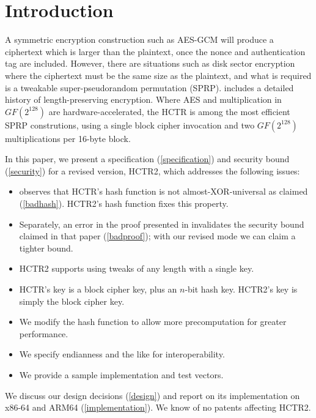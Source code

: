 \documentclass[hctr2.tex]{subfiles}
\begin{document}
\section{Introduction}
A symmetric encryption construction such as AES-GCM\cite{gcm}
will produce a ciphertext which is larger than
the plaintext, once the nonce and authentication tag are included. However,
there are situations such as disk sector encryption
where the ciphertext must be the same size as the
plaintext, and what is required is a tweakable
super-pseudorandom permutation\cite{cmc} (SPRP). 
\cite{adiantum} includes a detailed history of length-preserving encryption.
Where AES and multiplication in \(GF(2^{128})\) are hardware-accelerated,
the HCTR\cite{hctr} is among the most efficient 
SPRP construtions, using
a single block cipher invocation and two \(GF(2^{128})\) multiplications
per 16-byte block.

In this paper, we present 
a specification (\autoref{specification})
and security bound (\autoref{security})
for a revised version, HCTR2, which 
addresses the following issues:
\begin{itemize}
    \item \cite{kumarhctr} observes that HCTR's hash function
    is not almost-XOR-universal\cite{eadu} as claimed (\autoref{badhash}).
    HCTR2's hash function fixes this property.
    \item Separately,
    an error in the proof presented in \cite{hctrquad}
    invalidates the security bound claimed in that paper (\autoref{badproof}); with our revised
    mode we can claim a tighter bound.
    \item HCTR2 supports using tweaks of any length with a single key.
    \item HCTR's key is a block cipher key, plus an \(n\)-bit
    hash key. HCTR2's key is simply
    the block cipher key.
    \item We modify the hash function to allow more precomputation
    for greater performance.
    \item We specify endianness and the like for interoperability.
    \item We provide a sample implementation and test vectors.
\end{itemize}
We discuss our design decisions (\autoref{design})
and report on its implementation on x86-64 and ARM64 (\autoref{implementation}).
We know of no patents affecting HCTR2.

\end{document}

